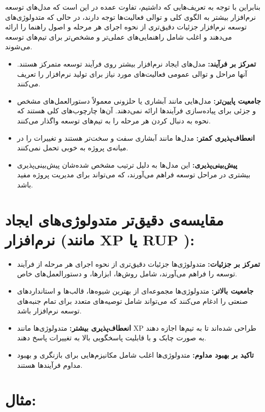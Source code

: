 بنابراین با توجه به تعریف‌هایی که داشتیم، تفاوت عمده در این است که مدل‌های توسعه نرم‌افزار بیشتر به الگوی کلی و توالی فعالیت‌ها توجه دارند، در حالی که متدولوژی‌های توسعه نرم‌افزار جزئیات دقیق‌تری از نحوه اجرای هر مرحله و اصول راهنما را ارائه می‌دهند و اغلب شامل راهنمایی‌های عملی‌تر و مشخص‌تر برای تیم‌های توسعه می‌شوند.

\begin{itemize}
	\item \textbf{تمرکز بر فرآیند:} مدل‌های ایجاد نرم‌افزار بیشتر روی فرآیند توسعه متمرکز هستند. آنها مراحل و توالی عمومی فعالیت‌های مورد نیاز برای تولید نرم‌افزار را تعریف می‌کنند.
	\item \textbf{جامعیت پایین‌تر:} مدل‌هایی مانند آبشاری یا حلزونی معمولاً دستورالعمل‌های مشخص و جزئی برای پیاده‌سازی فرآیندها ارائه نمی‌دهند. آن‌ها چارچوب‌های کلی هستند که نحوه به دنبال کردن هر مرحله را به تیم‌های توسعه واگذار می‌کنند.
	\item \textbf{انعطاف‌پذیری کمتر:} مدل‌ها مانند آبشاری سفت و سخت‌تر هستند و تغییرات را در میانه‌ی پروژه به خوبی تحمل نمی‌کنند.
	\item \textbf{پیش‌بینی‌پذیری:} این مدل‌ها به دلیل ترتیب مشخص شده‌شان پیش‌بینی‌پذیری بیشتری در مراحل توسعه فراهم می‌آورند، که می‌تواند برای مدیریت پروژه مفید باشد.
\end{itemize}

\section*{مقایسه‌ی دقیق‌تر متدولوژی‌های ایجاد نرم‌افزار (مانند XP یا RUP ):}

\begin{itemize}
	\item \textbf{تمرکز بر جزئیات:} متدولوژی‌ها جزئیات دقیق‌تری از نحوه اجرای هر مرحله از فرآیند توسعه را فراهم می‌آورند، شامل روش‌ها، ابزارها، و دستورالعمل‌های خاص.
	\item \textbf{جامعیت بالاتر:} متدولوژی‌ها مجموعه‌ای از بهترین شیوه‌ها، قالب‌ها و استانداردهای صنعتی را ادغام می‌کنند که می‌تواند شامل توصیه‌های متعدد برای تمام جنبه‌های توسعه نرم‌افزار باشد.
	\item \textbf{انعطاف‌پذیری بیشتر:} متدولوژی‌ها مانند XP طراحی شده‌اند تا به تیم‌ها اجازه دهند به صورت چابک و با قابلیت پاسخگویی بالا به تغییرات پاسخ دهند.
	\item \textbf{تاکید بر بهبود مداوم:} متدولوژی‌ها اغلب شامل مکانیزم‌هایی برای بازنگری و بهبود مداوم فرآیندها هستند.
\end{itemize}

\section*{مثال:}

